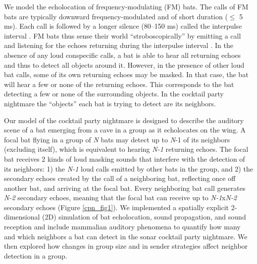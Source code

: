 \documentclass[
]{book}
\begin{document}
We model the echolocation of frequency-modulating (FM) bats. The calls of FM bats are typically downward frequency-modulated and of short duration (\(\leq\) 5 ms). Each call is followed by a longer silence (80--150 ms) called the interpulse interval \citep{jones1999a}. FM bats thus sense their world ``stroboscopically'' by emitting a call and listening for the echoes returning during the interpulse interval \citep{griffin1941a}. In the absence of any loud conspecific calls, a bat is able to hear all returning echoes and thus to detect all objects around it. However, in the presence of other loud bat calls, some of its own returning echoes may be masked. In that case, the bat will hear a few or none of the returning echoes. This corresponds to the bat detecting a few or none of the surrounding objects. In the cocktail party nightmare the ``objects'' each bat is trying to detect are its neighbors.

Our model of the cocktail party nightmare is designed to describe the auditory scene \citep{ulanovsky2008a} of a bat emerging from a cave in a group as it echolocates on the wing. A focal bat flying in a group of \emph{N} bats may detect up to \emph{N}-1 of its neighbors (excluding itself), which is equivalent to hearing \emph{N-1} returning echoes. The focal bat receives 2 kinds of loud masking sounds that interfere with the detection of its neighbors: 1) the \emph{N-1} loud calls emitted by other bats in the group, and 2) the secondary echoes created by the call of a neighboring bat, reflecting once off another bat, and arriving at the focal bat. Every neighboring bat call generates \emph{N-2} secondary echoes, meaning that the focal bat can receive up to \emph{N-1}x\emph{N-2} secondary echoes (Figure \ref{cpn_fig1}). We implemented a spatially explicit 2-dimensional (2D) simulation of bat echolocation, sound propagation, and sound reception and include mammalian auditory phenomena to quantify how many and which neighbors a bat can detect in the sonar cocktail party nightmare. We then explored how changes in group size and in sender strategies affect neighbor detection in a group.
\end{document}

